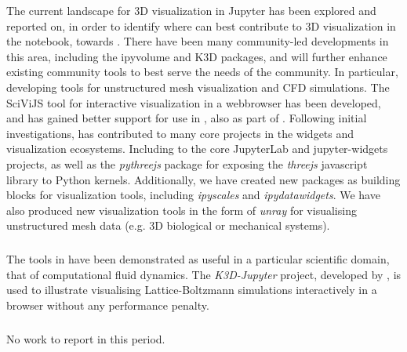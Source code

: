 The current landscape for 3D visualization in Jupyter has been explored and reported on,
in order to identify where \ODK can best contribute to 3D visualization in the notebook, towards . There have been many community-led developments in this area, including the ipyvolume and K3D packages, and \ODK will further enhance existing community tools to best serve the needs of the community. In particular, developing tools for unstructured mesh visualization and CFD simulations. The SciViJS tool for interactive visualization in a webbrowser has been developed, and has gained better support for use in \Jupyter, also as part of .
Following initial investigations, \ODK has contributed to many core projects in the \Jupyter widgets and visualization ecosystems. Including to the core JupyterLab and jupyter-widgets projects,
as well as the \emph{pythreejs} package for exposing the \emph{threejs} javascript library to Python kernels.
Additionally, we have created new packages as building blocks for visualization tools,
including \emph{ipyscales} and \emph{ipydatawidgets}.
We have also produced new visualization tools in the form of \emph{unray} for visualising unstructured mesh data
(e.g. 3D biological or mechanical systems).

\subparagraph{} %

The tools in  have been demonstrated as useful in a particular scientific domain,
that of computational fluid dynamics.
The \emph{K3D-Jupyter} project, developed by \ODK, is used to illustrate visualising Lattice-Boltzmann
simulations interactively in a browser without any performance penalty.

\subparagraph{} %

No work to report in this period.

\subparagraph{} %

